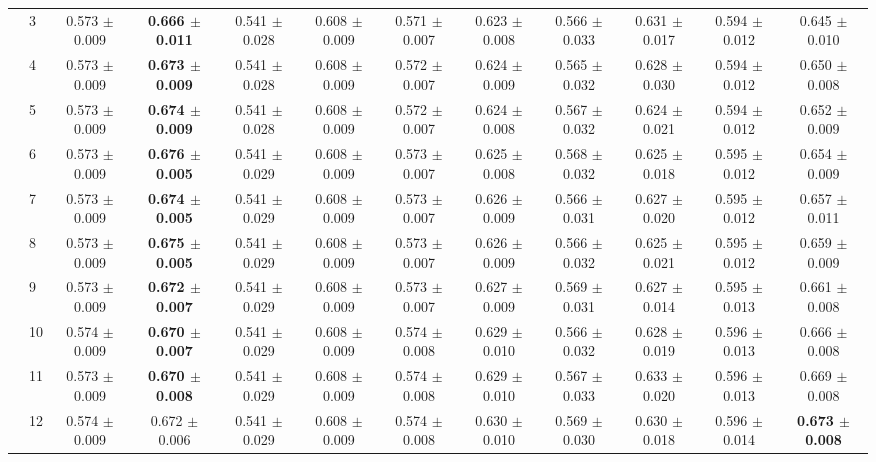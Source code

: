 \begin{table*}[t]
{\begin{tabular}{%
  ll
  @{\quad}
  c@{\hskip 4pt}c
  @{\quad\quad}
  c@{\hskip 4pt}c
  @{\quad\quad}
  c@{\hskip 4pt}c
  @{\quad\quad}
  c@{\hskip 4pt}c
  @{\quad\quad}
  c@{\hskip 4pt}c
}
        & 3 & 0.573 $\pm$ 0.009 & \textbf{0.666 $\pm$ 0.011} & 0.541 $\pm$ 0.028 & 0.608 $\pm$ 0.009 & 0.571 $\pm$ 0.007 & 0.623 $\pm$ 0.008 & 0.566 $\pm$ 0.033 & 0.631 $\pm$ 0.017 & 0.594 $\pm$ 0.012 & 0.645 $\pm$ 0.010 \\
        & 4 & 0.573 $\pm$ 0.009 & \textbf{0.673 $\pm$ 0.009} & 0.541 $\pm$ 0.028 & 0.608 $\pm$ 0.009 & 0.572 $\pm$ 0.007 & 0.624 $\pm$ 0.009 & 0.565 $\pm$ 0.032 & 0.628 $\pm$ 0.030 & 0.594 $\pm$ 0.012 & 0.650 $\pm$ 0.008 \\
        & 5 & 0.573 $\pm$ 0.009 & \textbf{0.674 $\pm$ 0.009} & 0.541 $\pm$ 0.028 & 0.608 $\pm$ 0.009 & 0.572 $\pm$ 0.007 & 0.624 $\pm$ 0.008 & 0.567 $\pm$ 0.032 & 0.624 $\pm$ 0.021 & 0.594 $\pm$ 0.012 & 0.652 $\pm$ 0.009 \\
        & 6 & 0.573 $\pm$ 0.009 & \textbf{0.676 $\pm$ 0.005} & 0.541 $\pm$ 0.029 & 0.608 $\pm$ 0.009 & 0.573 $\pm$ 0.007 & 0.625 $\pm$ 0.008 & 0.568 $\pm$ 0.032 & 0.625 $\pm$ 0.018 & 0.595 $\pm$ 0.012 & 0.654 $\pm$ 0.009 \\
        & 7 & 0.573 $\pm$ 0.009 & \textbf{0.674 $\pm$ 0.005} & 0.541 $\pm$ 0.029 & 0.608 $\pm$ 0.009 & 0.573 $\pm$ 0.007 & 0.626 $\pm$ 0.009 & 0.566 $\pm$ 0.031 & 0.627 $\pm$ 0.020 & 0.595 $\pm$ 0.012 & 0.657 $\pm$ 0.011 \\
        & 8 & 0.573 $\pm$ 0.009 & \textbf{0.675 $\pm$ 0.005} & 0.541 $\pm$ 0.029 & 0.608 $\pm$ 0.009 & 0.573 $\pm$ 0.007 & 0.626 $\pm$ 0.009 & 0.566 $\pm$ 0.032 & 0.625 $\pm$ 0.021 & 0.595 $\pm$ 0.012 & 0.659 $\pm$ 0.009 \\
        & 9 & 0.573 $\pm$ 0.009 & \textbf{0.672 $\pm$ 0.007} & 0.541 $\pm$ 0.029 & 0.608 $\pm$ 0.009 & 0.573 $\pm$ 0.007 & 0.627 $\pm$ 0.009 & 0.569 $\pm$ 0.031 & 0.627 $\pm$ 0.014 & 0.595 $\pm$ 0.013 & 0.661 $\pm$ 0.008 \\
        & 10 & 0.574 $\pm$ 0.009 & \textbf{0.670 $\pm$ 0.007} & 0.541 $\pm$ 0.029 & 0.608 $\pm$ 0.009 & 0.574 $\pm$ 0.008 & 0.629 $\pm$ 0.010 & 0.566 $\pm$ 0.032 & 0.628 $\pm$ 0.019 & 0.596 $\pm$ 0.013 & 0.666 $\pm$ 0.008 \\
        & 11 & 0.573 $\pm$ 0.009 & \textbf{0.670 $\pm$ 0.008} & 0.541 $\pm$ 0.029 & 0.608 $\pm$ 0.009 & 0.574 $\pm$ 0.008 & 0.629 $\pm$ 0.010 & 0.567 $\pm$ 0.033 & 0.633 $\pm$ 0.020 & 0.596 $\pm$ 0.013 & 0.669 $\pm$ 0.008 \\
        & 12 & 0.574 $\pm$ 0.009 & 0.672 $\pm$ 0.006 & 0.541 $\pm$ 0.029 & 0.608 $\pm$ 0.009 & 0.574 $\pm$ 0.008 & 0.630 $\pm$ 0.010 & 0.569 $\pm$ 0.030 & 0.630 $\pm$ 0.018 & 0.596 $\pm$ 0.014 & \textbf{0.673 $\pm$ 0.008} \\

\end{tabular}}
\end{table*}
